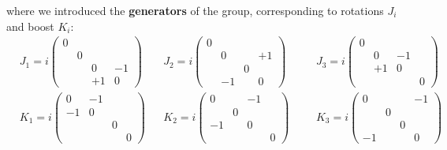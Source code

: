 \documentclass[../main.tex]{subfiles}
\begin{document}
where we introduced the \textbf{generators} of the group, corresponding to rotations $J_i$ and boost $K_i$:
\[
\begin{aligned}
&J_1=i\left(\begin{array}{cccc}
     0 & & & \\
     & 0 & & \\
     & & 0 & -1 \\
     & & +1 & 0
\end{array}\right)
&&J_2=i\left(\begin{array}{cccc}
     0 & & & \\
     & 0 & & +1\\
     & & 0 &  \\
     & -1 &  & 0
\end{array}\right)
&&&J_3=i\left(\begin{array}{cccc}
     0 & & & \\
     & 0 & -1 & \\
     & +1 & 0 &  \\
     & &  & 0
\end{array}\right)\\
&K_1=i\left(\begin{array}{cccc}
     0 & -1 & & \\
     -1 & 0 & & \\
     & & 0 &  \\
     & & & 0
\end{array}\right)
&&K_2=i\left(\begin{array}{cccc}
     0 & & -1 & \\
     & 0 & & \\
     -1 & & 0 &  \\
     &  &  & 0
\end{array}\right)
&&&K_3=i\left(\begin{array}{cccc}
     0 & & & -1 \\
     & 0 & & \\
     & & 0 &  \\
     -1 & &  & 0
\end{array}\right)
\end{aligned}
\]
\end{document}
